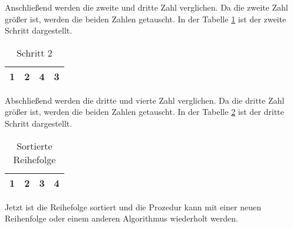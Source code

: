 \documentclass[./entry.tex]{subfiles}
\begin{document}
    Anschließend werden die zweite und dritte Zahl verglichen.
    Da die zweite Zahl größer ist, werden die beiden Zahlen getauscht.
    In der Tabelle \ref{tab:lessons-step2} ist der zweite Schritt dargestellt.


    \begin{table}[h]
        \centering
        \begin{tabular}{|c|c|c|c|}
            \hline
            1 & 2 & 4 & 3 \\
            \hline
        \end{tabular}
        \caption{Schritt 2}
        \label{tab:lessons-step2}
    \end{table}

    Abschließend werden die dritte und vierte Zahl verglichen.
    Da die dritte Zahl größer ist, werden die beiden Zahlen getauscht.
    In der Tabelle \ref{tab:lessons-step3} ist der dritte Schritt dargestellt.


    \begin{table}[h]
        \centering
        \begin{tabular}{|c|c|c|c|}
            \hline
            1 & 2 & 3 & 4 \\
            \hline
        \end{tabular}
        \caption{Sortierte Reihefolge}
        \label{tab:lessons-step3}
    \end{table}

    Jetzt ist die Reihefolge sortiert und die Prozedur kann
    mit einer neuen Reihenfolge oder einem anderen Algorithmus wiederholt werden.
\end{document}
